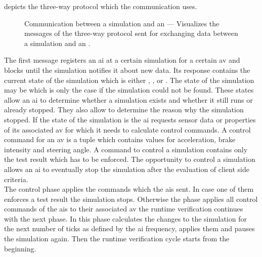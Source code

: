  depicts the three-way protocol which the communication uses.
\begin{figure}
    \centering
    
    \medskip
    \caption{%
        Communication between a simulation and an  --- Visualizes the messages of the three-way protocol sent for exchanging data between a simulation and an .
    }\label{fig:aiSimProtocol}
\end{figure}
The first message registers an \gls{ai} at a certain simulation for a certain \gls{av} and blocks until the simulation notifies it about new data.
Its response contains the current state of the simulation which is either \ssrunning{}, \ssfinished{}, \sscanceled{} or \sstimeout{}.
The state of the simulation may be \ssunknown{} which is only the case if the simulation could not be found.
These states allow an \gls{ai} to determine whether a simulation exists and whether it still runs or already stopped.
They also allow to determine the reason why the simulation stopped.
If the state of the simulation is \ssrunning{} the \gls{ai} requests sensor data or properties of its associated \gls{av} for which it needs to calculate control commands.
A control command for an \gls{av} is a tuple which contains values for acceleration, brake intensity and steering angle.
A command to control a simulation contains only the test result which has to be enforced.
The opportunity to control a simulation allows an \gls{ai} to eventually stop the simulation after the evaluation of client side criteria.\\
The control phase applies the commands which the \glspl{ai} sent.
In case one of them enforces a test result the simulation stops.
Otherwise the phase applies all control commands of the \glspl{ai} to their associated \gls{av} the runtime verification continues with the next phase.
In this phase \beamng{} calculates the changes to the simulation for the next number of ticks as defined by the \gls{ai} frequency, applies them and pauses the simulation again.
Then the runtime verification cycle starts from the beginning.

